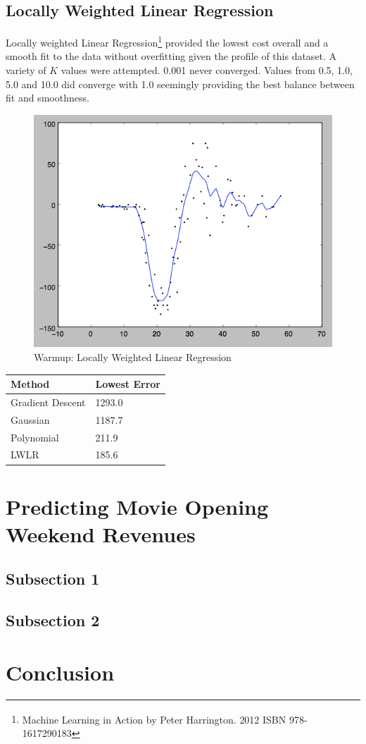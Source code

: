 \documentclass[11pt, oneside]{article}   	%
\begin{document}
\subsection*{Locally Weighted Linear Regression}

Locally weighted Linear Regression\footnote{Machine Learning in Action by Peter Harrington. \textsuperscript{\textcopyright} 2012 ISBN 978-1617290183} provided the lowest cost overall and a smooth fit to the data without overfitting given the profile of this dataset. A variety of $K$ values were attempted. 0.001 never converged. Values from 0.5, 1.0, 5.0 and 10.0 did converge with 1.0 seemingly providing the best balance between fit and smoothness.




\begin{figure}[h!] 
\centering
\includegraphics[scale=0.6]{lwlr}
\caption{Warmup: Locally Weighted Linear Regression}
\end{figure}

\begin{center}
    \begin{tabular}{| l | l |}
    \hline
    Method & Lowest Error \\ \hline
    Gradient Descent & 1293.0 \\
    Gaussian & 1187.7 \\
    Polynomial & 211.9 \\
    LWLR & 185.6 \\
    \hline
    \end{tabular}
\end{center}


\section*{Predicting Movie Opening Weekend Revenues}


\subsection*{Subsection 1}

\subsection*{Subsection 2}

\section*{Conclusion}
\end{document}
